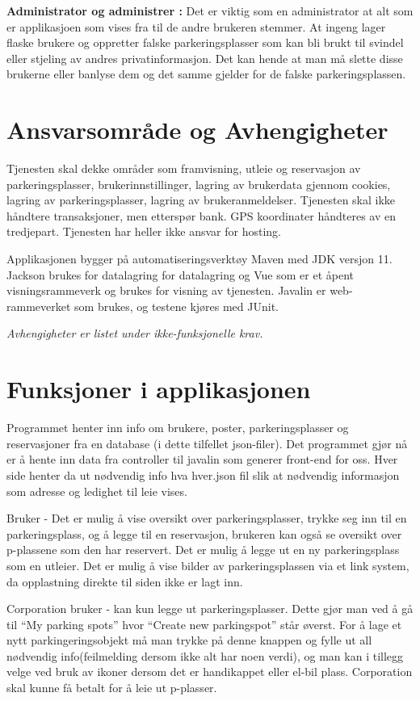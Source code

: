\documentclass[12pt]{article}
\begin{document}
    \textbf{Administrator og administrer :} Det er viktig som en administrator at alt som er applikasjoen som vises fra til de andre brukeren stemmer. At ingeng lager flaske brukere og oppretter falske parkeringsplasser som kan bli brukt til svindel eller stjeling av andres privatinformasjon. Det kan hende at man må slette disse brukerne eller banlyse dem og det samme gjelder for de falske parkeringsplassen.


\section{Ansvarsområde og Avhengigheter}
Tjenesten skal dekke områder som framvisning, utleie og reservasjon av parkeringsplasser, brukerinnstillinger, lagring av brukerdata gjennom cookies, lagring av parkeringsplasser, lagring av brukeranmeldelser. Tjenesten skal ikke håndtere transaksjoner, men etterspør bank. GPS koordinater håndteres av en tredjepart. Tjenesten har heller ikke ansvar for hosting.

Applikasjonen bygger på automatiseringsverktøy Maven med JDK versjon 11. Jackson brukes for datalagring for datalagring og Vue som er et åpent visningsrammeverk og brukes for visning av tjenesten. Javalin er web-rammeverket som brukes, og testene kjøres med JUnit.

\textit{Avhengigheter er listet under ikke-funksjonelle krav.} 


\section{Funksjoner i applikasjonen}

Programmet henter inn info om brukere, poster, parkeringsplasser og reservasjoner fra en database (i dette tilfellet json-filer). Det programmet gjør nå er å hente inn data fra controller til javalin som generer front-end for oss. Hver side henter da ut nødvendig info hva hver.json fil slik at nødvendig informasjon som adresse og ledighet til leie vises.

Bruker -  Det er mulig å vise oversikt over parkeringsplasser, trykke seg inn til en parkeringsplass, og å legge til en reservasjon, brukeren kan også se oversikt over p-plassene som den har reservert. Det er mulig å legge ut en ny parkeringsplass som en utleier. Det er mulig å vise bilder av parkeringsplassen via et link system, da opplastning direkte til siden ikke er lagt inn. 

Corporation bruker - kan kun legge ut parkeringsplasser. Dette gjør man ved å gå til “My parking spots” hvor “Create new parkingspot” står øverst. For å lage et nytt parkingeringsobjekt må man trykke på denne knappen og fylle ut all nødvendig info(feilmelding dersom ikke alt har noen verdi), og man kan i tillegg velge ved bruk av ikoner dersom det er handikappet eller el-bil plass. Corporation skal kunne få betalt for å leie ut p-plasser.
\end{document}
